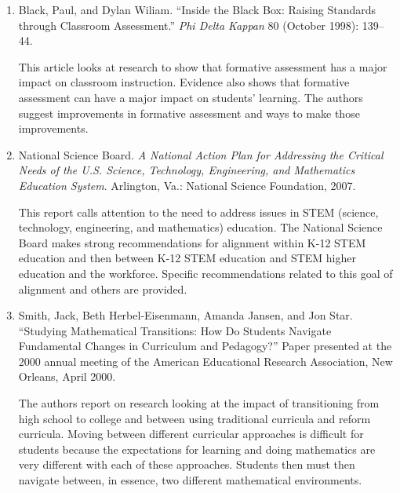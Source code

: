 \documentclass[
  10pt,
  a4paper,
  landscape,
  twoside,
  openany
]{scrbook}
\newcommand{\EN}[1]{#1}
\begin{document}
\TriPara
{
\EN{
  \begin{enumerate}
    \item Black, Paul, and Dylan Wiliam. ``Inside the Black Box: Raising Standards through Classroom Assessment.'' \emph{Phi Delta Kappan} 80 (October 1998): 139--44.

      This article looks at research to show that formative assessment has a major impact on classroom instruction. Evidence also shows that formative assessment can have a major impact on students' learning. The authors suggest improvements in formative assessment and ways to make those improvements.

    \item National Science Board. \emph{A National Action Plan for Addressing the Critical Needs of the U.S. Science, Technology, Engineering, and Mathematics Education System}. Arlington, Va.: National Science Foundation, 2007.

      This report calls attention to the need to address issues in STEM (science, technology, engineering, and mathematics) education. The National Science Board makes strong recommendations for alignment within K-12 STEM education and then between K-12 STEM education and STEM higher education and the workforce. Specific recommendations related to this goal of alignment and others are provided.

    \item Smith, Jack, Beth Herbel-Eisenmann, Amanda Jansen, and Jon Star. ``Studying Mathematical Transitions: How Do Students Navigate Fundamental Changes in Curriculum and Pedagogy?'' Paper presented at the 2000 annual meeting of the American Educational Research Association, New Orleans, April 2000.

      The authors report on research looking at the impact of transitioning from high school to college and between using traditional curricula and reform curricula. Moving between different curricular approaches is difficult for students because the expectations for learning and doing mathematics are very different with each of these approaches. Students then must then navigate between, in essence, two different mathematical environments.
  \end{enumerate}}
}
\end{document}

